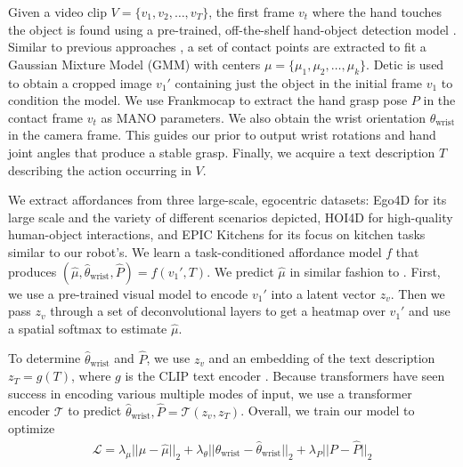 Given a video clip $V = \{ v_1, v_2, \dots, v_T \} $, the first frame $v_t$ where the hand touches the object is found using a pre-trained, off-the-shelf hand-object detection model \cite{100doh}. Similar to previous approaches \cite{bahl2023affordances, hap, hoi, hotspots}, a set of contact points are extracted to fit a Gaussian Mixture Model (GMM) with centers $\mu = \{ \mu_1, \mu_2, \dots, \mu_k \}$.  Detic \cite{detic} is used to obtain a cropped image $v_1'$ containing just the object in the initial frame $v_1$ to condition the model. We use Frankmocap \cite{FrankMocap_2021_ICCV} to extract the hand grasp pose $P$ in the contact frame $v_t$ as MANO parameters. We also obtain the wrist orientation $\theta_\text{wrist}$ in the camera frame. This guides our prior to output wrist rotations and hand joint angles that produce a stable grasp. Finally, we acquire a text description $T$ describing the action occurring in $V$.

We extract affordances from three large-scale, egocentric datasets: Ego4D \cite{ego4d} for its large scale and the variety of different scenarios depicted, HOI4D \cite{hoi4d} for high-quality human-object interactions, and EPIC Kitchens \cite{EPICKITCHENS} for its focus on kitchen tasks similar to our robot's. We learn a task-conditioned affordance model $f$ that produces $(\hat{\mu}, \hat{\theta}_\text{wrist}, \hat{P}) = f(v_1', T)$. We predict $\hat{\mu}$ in similar fashion to \cite{bahl2023affordances}. First, we use a pre-trained visual model \cite{r3m} to encode $v_1'$ into a latent vector $z_v$. Then we pass $z_v$ through a set of deconvolutional layers to get a heatmap over $v_1'$ and use a spatial softmax to estimate $\hat{\mu}$.

To determine $\hat{\theta}_\text{wrist}$ and $\hat{P}$, we use $z_v$ and an embedding of the text description $z_T = g(T)$, where $g$ is the CLIP text encoder \cite{Clip}. Because transformers have seen success in encoding various multiple modes of input, we use a transformer encoder $\mathcal{T}$ to predict $\hat{\theta}_\text{wrist}, \hat{P} = \mathcal{T}(z_v, z_T)$. Overall, we train our model to optimize
\begin{align}
    \mathcal{L} = \lambda_\mu || \mu - \hat{\mu} ||_2 + \lambda_\theta || \theta_\text{wrist} - \hat{\theta}_\text{wrist} ||_2 + \lambda_P || P - \hat{P} ||_2
\end{align}


